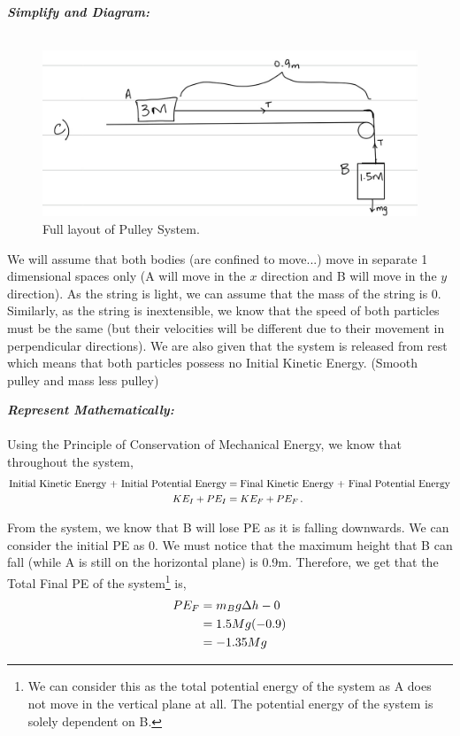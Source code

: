\begin{subquestions}
\textbf{\textit{Simplify and Diagram:}} \\ \\
\begin{figure}[H]
	\begin{center}
		\includegraphics[scale=0.25]{../2015/figures/2015q6-3}
		\caption{\label{2015:q6:fig:Diagram3} Full layout of Pulley System.}
	\end{center}
\end{figure}
We will assume that both bodies (are confined to move...) move in separate 1 dimensional spaces only (A will move in the $x$ direction and B will move in the $y$ direction). As the string is light, we can assume that the mass of the string is 0. Similarly, as the string is inextensible, we know that the speed of both particles must be the same (but their velocities will be different due to their movement in perpendicular directions). We are also given that the system is released from rest which means that both particles possess no Initial Kinetic Energy. (Smooth pulley and mass less pulley)
	
	
	
	
\textbf{\textit{Represent Mathematically:}} \\ \\
Using the Principle of Conservation of Mechanical Energy, we know that throughout the system,
\begin{align}
	\text{Initial Kinetic Energy + Initial Potential Energy} & = \text{Final Kinetic Energy + Final Potential Energy} \nonumber \\
	KE_I + PE_I & = KE_F + PE_F \,. \label{2015:q6:energy1}
\end{align}

From the system, we know that B will lose PE as it is falling downwards. We can consider the initial PE as 0. We must notice that the maximum height that B can fall (while A is still on the horizontal plane) is 0.9m. Therefore, we get that the Total Final PE of the system\footnote{We can consider this as the total potential energy of the system as A does not move in the vertical plane at all. The potential energy of the system is solely dependent on B.} is,
\begin{align}
	PE_F &  = m_Bg\Delta h - 0 \nonumber \\
	          & = 1.5Mg(-0.9) \nonumber \\
	          & = -1.35Mg
\end{align}


\end{subquestions}
